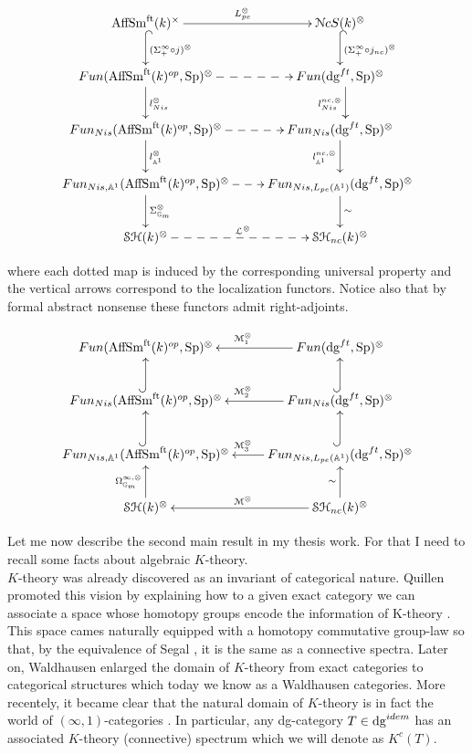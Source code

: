 \begin{refsection}
\begin{equation}
\label{diagramaleft}
\xymatrix{
\aff^{\times}\ar@{^{(}->}[d]^{(\Sigma^{\infty}_{+}\circ j)^{\otimes}}\ar[r]^{L_{pe}^{\otimes}}& \nck^{\otimes}\ar@{^{(}->}[d]^{(\Sigma^{\infty}_{+}\circ j_{nc})^{\otimes}}\\
Fun(\aff^{op}, \Sp)^{\otimes}\ar[d]^{l_{Nis}^{\otimes}}\ar@{-->}[r]& Fun(\dg^{ft}, \Sp)^{\otimes}\ar@<1ex>[d]_{l_{Nis}^{nc, \otimes}}\\
Fun_{Nis}(\aff^{op}, \Sp)^{\otimes}  \ar[d]^{l_{\mathbb{A}^1}^{\otimes}}\ar@{-->}[r]& Fun_{Nis}(\dg^{ft}, \Sp)^{\otimes}\ar[d]_{l_{\mathbb{A}^1}^{nc,\otimes}} \\
Fun_{Nis, \mathbb{A}^1}(\aff^{op}, \Sp)^{\otimes}  \ar[d]^{\Sigma_{\mathbb{G}_m}^{\otimes}}\ar@{-->}[r]& Fun_{Nis, L_{pe}(\mathbb{A}^1)}(\dg^{ft}, \Sp)^{\otimes}\ar[d]^{\sim} \\
\stmonoidalk\ar@{-->}[r]^{\mathcal{L}^{\otimes}}&\stncmonoidalk
}
\end{equation}

\noindent where each dotted map is induced by the corresponding universal property and the vertical arrows correspond to the localization functors. Notice also that by formal abstract nonsense these functors admit right-adjoints.


\begin{equation}
\label{diagramaright}
\xymatrix{
Fun(\aff^{op}, \Sp)^{\otimes}& \ar[l]_{\M_1^{\otimes}} Fun(\dg^{ft}, \Sp)^{\otimes}\\
\ar@{^{(}->}[u]  Fun_{Nis}(\aff^{op}, \Sp)^{\otimes}  & \ar@{^{(}->}[u] \ar[l]_{\M_2^{\otimes}} Fun_{Nis}(\dg^{ft}, \Sp)^{\otimes}\\
\ar@{^{(}->}[u]  Fun_{Nis, \mathbb{A}^1}(\aff^{op}, \Sp)^{\otimes} & \ar@{^{(}->}[u] \ar[l]_{\M_3^{\otimes}} Fun_{Nis, L_{pe}(\mathbb{A}^1)}(\dg^{ft}, \Sp)^{\otimes} \\
\stmonoidalk \ar[u]^{\Omega^{\infty,\otimes}_{\mathbb{G}_m}}& \ar[l]_{\M^{\otimes}}\stncmonoidalk \ar[u]^{\sim}
}
\end{equation}

Let me now describe the second main result in my thesis work. For that I need to recall some facts about algebraic $K$-theory. \\

$K$-theory was already discovered as an invariant of categorical nature. Quillen promoted this vision by explaining how to a given exact category we can associate a space whose homotopy groups encode the information of K-theory \cite{MR0338129}. This space cames naturally equipped with a homotopy commutative group-law so that, by the equivalence of Segal \cite{MR0353298}, it is the same as a connective spectra. Later on, Waldhausen \cite{waldhausen-ktheoryofspaces} enlarged the domain of $K$-theory from exact categories to categorical structures which today we know as a Waldhausen categories. More recentely, it became clear that the natural domain of $K$-theory is in fact the world of $(\infty,1)$-categories \cite{toenvezzosi-remarkonKtheory,1204.3607}. In particular, any dg-category $T\in \mathrm{dg}^{idem}$ has an associated $K$-theory (connective) spectrum which we will denote as $K^c(T)$.





\end{refsection}
